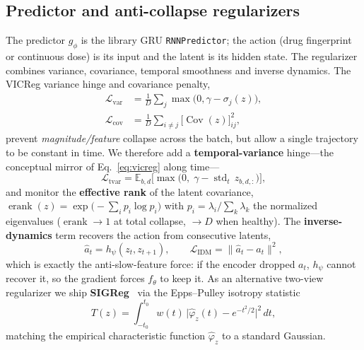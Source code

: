 \documentclass[10pt,twocolumn]{article}
\DeclareMathOperator{\std}{std}
\DeclareMathOperator{\Cov}{Cov}
\DeclareMathOperator{\erank}{erank}
\newcommand{\E}{\mathbb{E}}
\begin{document}
\subsection{Predictor and anti-collapse regularizers}
The predictor $g_\phi$ is the library GRU \texttt{RNNPredictor}; the action (drug fingerprint or
continuous dose) is its input and the latent is its hidden state. The regularizer combines variance,
covariance, temporal smoothness and inverse dynamics. The VICReg variance hinge and covariance penalty,
\begin{equation}
\begin{aligned}
\mathcal{L}_{\mathrm{var}}&=\tfrac1D\textstyle\sum_{j}\max\!\big(0,\gamma-\sigma_j(z)\big),\\[2pt]
\mathcal{L}_{\mathrm{cov}}&=\tfrac1D\textstyle\sum_{i\neq j}\big[\Cov(z)\big]_{ij}^2,
\end{aligned}
\label{eq:vicreg}
\end{equation}
prevent \emph{magnitude/feature} collapse across the batch, but allow a single trajectory to be constant
in time. We therefore add a \textbf{temporal-variance} hinge---the conceptual mirror of
Eq.~\eqref{eq:vicreg} along time---
\begin{equation}
\mathcal{L}_{\mathrm{tvar}}=\E_{b,d}\Big[\max\!\big(0,\;\gamma-\std_t\,z_{b,d,:}\big)\Big],
\label{eq:tvar}
\end{equation}
and monitor the \textbf{effective rank} of the latent covariance,
$\erank(z)=\exp\!\big(-\sum_i p_i\log p_i\big)$ with $p_i=\lambda_i/\sum_k\lambda_k$ the normalized
eigenvalues ($\erank\!\to\!1$ at total collapse, $\to\!D$ when healthy). The \textbf{inverse-dynamics}
term recovers the action from consecutive latents,
\begin{equation}
\hat a_t = h_\psi(z_t,z_{t+1}),\qquad
\mathcal{L}_{\mathrm{IDM}}=\lVert \hat a_t - a_t\rVert^2,
\label{eq:idm}
\end{equation}
which is exactly the anti-slow-feature force: if the encoder dropped $a_t$, $h_\psi$ cannot recover it,
so the gradient forces $f_\theta$ to keep it. As an alternative two-view regularizer we ship
\textbf{SIGReg}~\cite{lejepa} via the Epps--Pulley isotropy statistic
\begin{equation}
T(z)=\!\int_{-t_0}^{t_0}\!\! w(t)\,\big|\widehat{\varphi}_z(t)-e^{-t^2/2}\big|^2\,dt,
\label{eq:sigreg}
\end{equation}
matching the empirical characteristic function $\widehat{\varphi}_z$ to a standard Gaussian.
\end{document}
